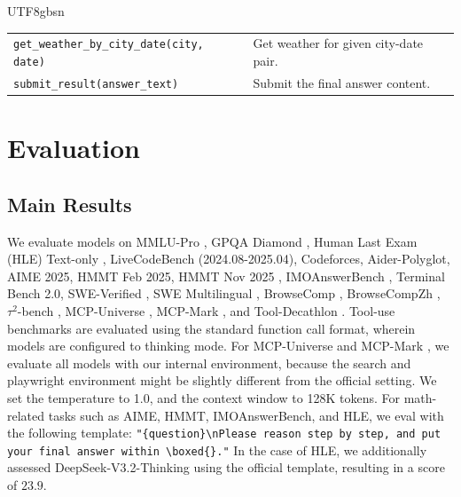 \documentclass[11pt, a4paper, logo, copyright, nonumbering]{deepseek}
\def\newmodel{DeepSeek-V3.2}
\begin{document}
\begin{CJK*}{UTF8}{gbsn}
\begin{tcolorbox}[
  floatplacement=ht,
  title={Tool Set for Trip Planning},
  label={case:tools}
]
\begin{tabularx}{\textwidth}{l X}
\texttt{get\_weather\_by\_city\_date(city, date)} &
Get weather for given city-date pair. \\[0.3em]

\texttt{submit\_result(answer\_text)} &
Submit the final answer content. \\
\bottomrule
\end{tabularx}
\end{tcolorbox}

\section{Evaluation}

\subsection{Main Results}
We evaluate models on MMLU-Pro \citep{mmlu_pro}, GPQA Diamond \citep{gpqa}, Human Last Exam (HLE) Text-only \citep{hle}, LiveCodeBench (2024.08-2025.04), Codeforces, Aider-Polyglot, AIME 2025, HMMT Feb 2025, HMMT Nov 2025 \citep{balunovic2025matharena}, IMOAnswerBench \citep{luong-etal-2025-towards}, Terminal Bench 2.0, SWE-Verified \citep{swe_verified}, SWE Multilingual \citep{yang2025swesmith}, BrowseComp \citep{wei2025browsecomp}, BrowseCompZh \citep{zhou2025browsecomp}, $\tau^2$-bench \citep{tau2}, MCP-Universe \citep{mcpuniverse}, MCP-Mark \citep{mcpmark}, and Tool-Decathlon \citep{li2025tool}. Tool-use benchmarks are evaluated using the standard function call format, wherein models are configured to thinking mode.
 For MCP-Universe \citep{mcpuniverse} and MCP-Mark \citep{mcpmark}, we evaluate all models with our internal environment, because the search and playwright environment might be slightly different from the official setting.   
We set the temperature to 1.0, and the context window to 128K tokens.
For math-related tasks such as AIME, HMMT, IMOAnswerBench, and HLE, we eval with the following template: \texttt{"\{question\}\textbackslash nPlease reason step by step, and put your final answer within \textbackslash boxed\{\}."}
In the case of HLE, we additionally assessed \newmodel{}-Thinking using the official template, resulting in a score of $23.9$.


\end{CJK*}
\end{document}
